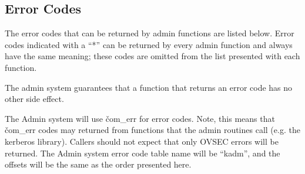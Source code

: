 \subsection{Error Codes}

The error codes that can be returned by admin functions are listed
below.  Error codes indicated with a ``*'' can be returned by every
admin function and always have the same meaning; these codes are
omitted from the list presented with each function.  

The admin system guarantees that a function that returns an error code
has no other side effect.

The Admin system will use \v{com_err} for error codes.  Note, this
means that \v{com_err} codes may returned from functions that the
admin routines call (e.g. the kerberos library). Callers should not
expect that only OVSEC errors will be returned.  The Admin system
error code table name will be ``kadm'', and the offsets will be the
same as the order presented here.

